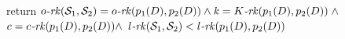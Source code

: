 \begin{function}[!t]
\SetNoFillComment
return
     $o\emph{-}\mathit{rk}(\mathcal{S}_1,\mathcal{S}_2)=o\emph{-}\mathit{rk}(p_1(D),
     p_2(D))\wedge\mathit{k}=K\emph{-}\mathit{rk}(p_1(D),p_2(D))\;\wedge$\\
    $c=c\emph{-}\mathit{rk}(p_1(D),
     p_2(D))\wedge$
     $l\emph{-}\mathit{rk}(\mathcal{S}_1,\mathcal{S}_2)<l\emph{-}\mathit{rk}(p_1(D), p_2(D))$\;
     \caption{better-cl(set $\mathcal{S}_1$, set $\mathcal{S}_2$,
     division $D$, int $k$, int $c$)}
	\label{better-cl}
\end{function}
